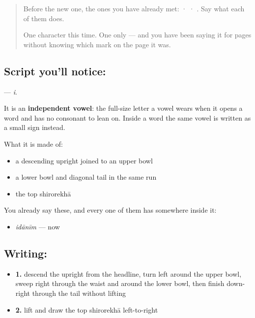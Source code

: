 \label{lesson:SA-S224-letter-i}



\begin{quote}
Before the new one, the ones you have already met:  ·  · . Say what each of them does.

One character this time. One only — and you have been saying it for pages without knowing which mark on the page it was.
\end{quote}

\subsection*{Script you'll notice: }
\textbf{} — \emph{i}.

It is an \textbf{independent vowel}: the full-size letter a vowel wears when it opens a word and has no consonant to lean on. Inside a word the same vowel is written as a small sign instead.

What it is made of:

\begin{itemize}
\raggedright
  \item a descending upright joined to an upper bowl
  \item a lower bowl and diagonal tail in the same run
  \item the top shirorekhā
\end{itemize}

You already say these, and every one of them has  somewhere inside it:

\begin{itemize}
\raggedright
  \item \textbf{} \emph{idānīm} — now
\end{itemize}

\subsection*{Writing: }

\begin{itemize}
\raggedright
  \item \textbf{1.} descend the upright from the headline, turn left around the upper bowl, sweep right through the waist and around the lower bowl, then finish down-right through the tail without lifting
  \item \textbf{2.} lift and draw the top shirorekhā left-to-right
\end{itemize}

